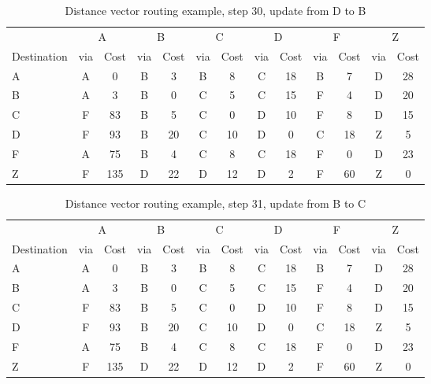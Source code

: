 \begin{table}
    \caption{Distance vector  routing example, step 30, update from D to B }
    \label{tab:dv:step:30}
\begin{tabular}{l|c|c|c|c|c|c|c|c|c|c|c|c}
    \toprule
      & \multicolumn{2}{c|}{A}&\multicolumn{2}{c|}{B}&\multicolumn{2}{c|}{C}&\multicolumn{2}{c|}{D}&\multicolumn{2}{c|}{F}&\multicolumn{2}{c|}{Z} \\
    Destination & via&Cost&via&Cost&via&Cost&via&Cost&via&Cost&via&Cost \\ 
    \midrule
    A & A & 0 &B & 3 &B & 8 &C & 18 &B & 7 &D & 28 
 \\B & A & 3 &B & 0 &C & 5 &C & 15 &F & 4 &D & 20 
 \\C & F & 83 &B & 5 &C & 0 &D & 10 &F & 8 &D & 15 
 \\D & F & 93 &B & 20 &C & 10 &D & 0 &C & 18 &Z & 5 
 \\F & A & 75 &B & 4 &C & 8 &C & 18 &F & 0 &D & 23 
 \\Z & F & 135 &D & 22 &D & 12 &D & 2 &F & 60 &Z & 0 
    \\ \bottomrule 
\end{tabular}
\end{table}
    

\begin{table}
    \caption{Distance vector  routing example, step 31, update from B to C }
    \label{tab:dv:step:31}
\begin{tabular}{l|c|c|c|c|c|c|c|c|c|c|c|c}
    \toprule
      & \multicolumn{2}{c|}{A}&\multicolumn{2}{c|}{B}&\multicolumn{2}{c|}{C}&\multicolumn{2}{c|}{D}&\multicolumn{2}{c|}{F}&\multicolumn{2}{c|}{Z} \\
    Destination & via&Cost&via&Cost&via&Cost&via&Cost&via&Cost&via&Cost \\ 
    \midrule
    A & A & 0 &B & 3 &B & 8 &C & 18 &B & 7 &D & 28 
 \\B & A & 3 &B & 0 &C & 5 &C & 15 &F & 4 &D & 20 
 \\C & F & 83 &B & 5 &C & 0 &D & 10 &F & 8 &D & 15 
 \\D & F & 93 &B & 20 &C & 10 &D & 0 &C & 18 &Z & 5 
 \\F & A & 75 &B & 4 &C & 8 &C & 18 &F & 0 &D & 23 
 \\Z & F & 135 &D & 22 &D & 12 &D & 2 &F & 60 &Z & 0 
    \\ \bottomrule 
\end{tabular}
\end{table}
    

